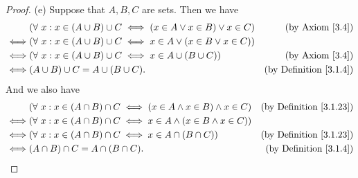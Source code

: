 \begin{proof}{(e)}
    Suppose that \(A, B, C\) are sets.
    Then we have
    \begin{align*}
             & (\forall\ x : x \in (A \cup B) \cup C \iff (x \in A \lor x \in B) \lor x \in C) & \text{(by Axiom \ref{3.4})}        \\
        \iff & (\forall\ x : x \in (A \cup B) \cup C \iff x \in A \lor (x \in B \lor x \in C))                                      \\
        \iff & (\forall\ x : x \in (A \cup B) \cup C \iff x \in A \cup (B \cup C))             & \text{(by Axiom \ref{3.4})}        \\
        \iff & (A \cup B) \cup C = A \cup (B \cup C).                                          & \text{(by Definition \ref{3.1.4})}
    \end{align*}
    And we also have
    \begin{align*}
             & (\forall\ x : x \in (A \cap B) \cap C \iff (x \in A \land x \in B) \land x \in C) & \text{(by Definition \ref{3.1.23})} \\
        \iff & (\forall\ x : x \in (A \cap B) \cap C \iff x \in A \land (x \in B \land x \in C))                                       \\
        \iff & (\forall\ x : x \in (A \cap B) \cap C \iff x \in A \cap (B \cap C))               & \text{(by Definition \ref{3.1.23})} \\
        \iff & (A \cap B) \cap C = A \cap (B \cap C).                                            & \text{(by Definition \ref{3.1.4})}
    \end{align*}
\end{proof}

